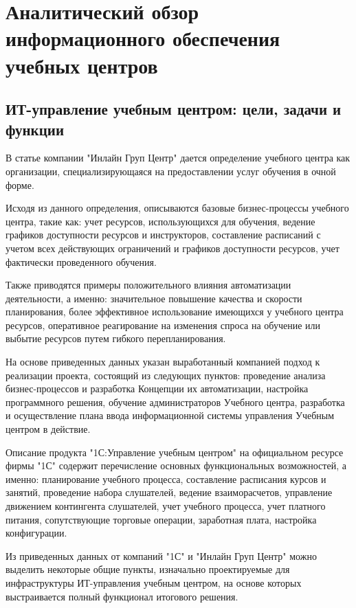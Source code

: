 \section{Аналитический обзор информационного обеспечения учебных центров}


\subsection{ИТ-управление учебным центром: цели, задачи и функции}

В статье компании "Инлайн Груп Центр" \cite{inlinegroup-c} дается определение учебного центра как организации, специализирующаяся на предоставлении услуг обучения в очной форме.

Исходя из данного определения, описываются базовые бизнес-процессы учебного центра, такие как: учет ресурсов, использующихся для обучения, ведение графиков доступности ресурсов и инструкторов, составление расписаний с учетом всех действующих ограничений и графиков доступности ресурсов, учет фактически проведенного обучения.

Также приводятся примеры положительного влияния автоматизации деятельности, а именно: значительное повышение качества и скорости планирования, более эффективное использование имеющихся у учебного центра ресурсов, оперативное реагирование на изменения спроса на обучение или выбытие ресурсов путем гибкого перепланирования.

На основе приведенных данных указан выработанный компанией подход к реализации проекта, состоящий из следующих пунктов: проведение анализа бизнес-процессов и разработка Концепции их автоматизации, настройка программного решения, обучение администраторов Учебного центра, разработка и осуществление плана ввода информационной системы управления Учебным центром в действие.

Описание продукта "1С:Управление учебным центром" на официальном ресурсе фирмы "1С" \cite{1c-training-center} содержит перечисление основных функциональных возможностей, а именно: планирование учебного процесса, составление расписания курсов и занятий, проведение набора слушателей, ведение взаиморасчетов, управление движением контингента слушателей, учет учебного процесса, учет платного питания, сопутствующие торговые операции, заработная плата, настройка конфигурации.

Из приведенных данных от компаний "1С" и "Инлайн Груп Центр" можно выделить некоторые общие пункты, изначально проектируемые для инфраструктуры ИТ-управления учебным центром, на основе которых выстраивается полный функционал итогового решения.


